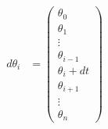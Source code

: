 \begin{align*}
    d\theta_i &= \begin{pmatrix}
    \theta_0 \\
    \theta_1\\
    \vdots \\
    \theta_{i-1}\\
    \theta_i + dt \\
    \theta_{i+1}\\
    \vdots \\
    \theta_n 
    \end{pmatrix} \\    
\end{align*}